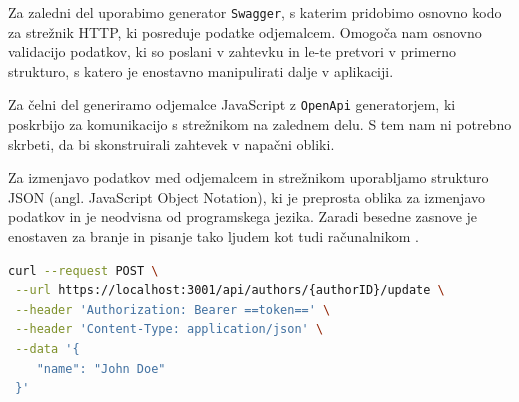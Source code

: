 \documentclass[a4paper, 12pt]{book}
\begin{document}
\clearpage
Za zaledni del uporabimo generator \verb=Swagger=, s katerim pridobimo osnovno kodo za strežnik HTTP, ki posreduje podatke odjemalcem. Omogoča nam osnovno validacijo podatkov, ki so poslani v zahtevku in le-te pretvori v primerno strukturo, s katero je enostavno manipulirati dalje v aplikaciji. 

Za čelni del generiramo odjemalce JavaScript z \verb=OpenApi= generatorjem, ki poskrbijo za komunikacijo s strežnikom na zalednem delu. S tem nam ni potrebno skrbeti, da bi skonstruirali zahtevek v napačni obliki.


Za izmenjavo podatkov med odjemalcem in strežnikom uporabljamo strukturo JSON (angl. JavaScript Object Notation), ki je preprosta oblika za izmenjavo podatkov in je neodvisna od programskega jezika. Zaradi besedne zasnove je enostaven za branje in pisanje tako ljudem kot tudi računalnikom \cite{json-rfc}.

\begin{lstlisting}[language=bash, style=mystyle,caption={Primer izvedbe API klica in odgovora},label=lst:api-call-example]
 curl --request POST \
 --url https://localhost:3001/api/authors/{authorID}/update \
 --header 'Authorization: Bearer ==token==' \
 --header 'Content-Type: application/json' \
 --data '{
    "name": "John Doe"
 }'
\end{lstlisting}
\end{document}
